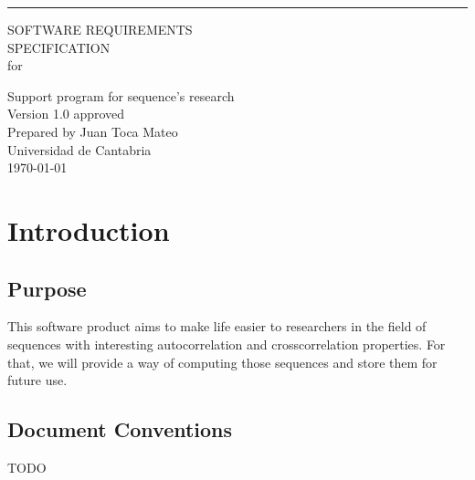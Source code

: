 \documentclass{scrreprt}
\date{}
\def\myversion{1.0 }
\begin{document}
\begin{flushright}
    \rule{16cm}{5pt}\vskip1cm
        \Huge{SOFTWARE REQUIREMENTS\\ SPECIFICATION}\\
        \vspace{1.9cm}
        for\\
        \begin{bfseries}
        \vspace{1.9cm}
        Support program for sequence's research\\
        \vspace{1.9cm}
        \LARGE{Version \myversion approved}\\
        \vspace{1.9cm}
        Prepared by Juan Toca Mateo\\
        Universidad de Cantabria\\
        \vspace{1.9cm}
        \today\\
    \end{bfseries}
    \vspace{1.9cm}
\end{flushright}

\tableofcontents

\chapter{Introduction}

\section{Purpose}

This software product aims to make life easier to researchers in the field of
sequences with interesting autocorrelation and crosscorrelation properties.
For that, we will provide a way of computing those sequences and store them for
future use.


\section{Document Conventions}

TODO\\

\end{document}
